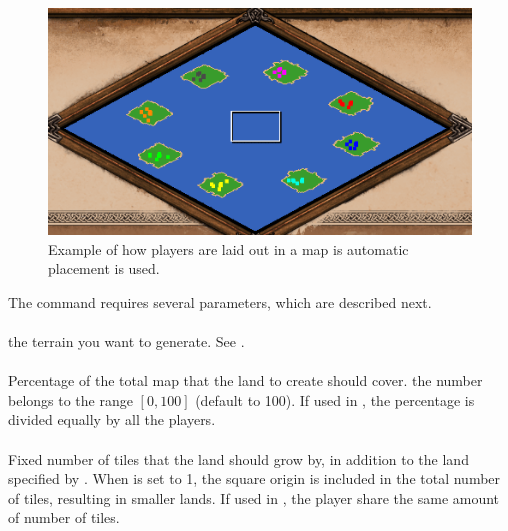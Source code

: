 \begin{appendices}
    \begin{figure}
        \centering
        \includegraphics[width=1.0\textwidth]{src/images/create-player-lands}
        \caption{Example of how players are laid out in a map is automatic placement is used.}
        \label{fig:create-player-lands}
    \end{figure}

    The command requires several parameters, which are described next.
    
    \paragraph{}
    the terrain you want to generate. See .

    \paragraph{}
    Percentage of the total map that the land to create should cover. the number belongs to the range $[0,100]$ (default to 100). If used in , the percentage is divided equally by all the players.

    \paragraph{}
    Fixed number of tiles that the land should grow by, in addition to the land specified by . When  is set to 1, the square origin is included in the total number of tiles, resulting in smaller lands. If used in , the player share the same amount of number of tiles.


\end{appendices}
